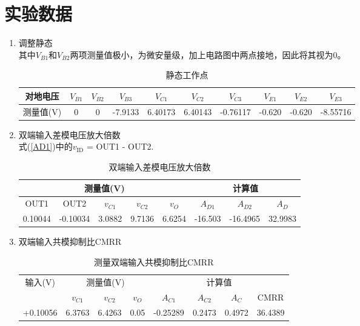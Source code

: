 \documentclass[a4paper]{article}
\begin{document}
\section{实验数据}
\begin{enumerate}
\item 调整静态\\
其中$V_{B1}$和$V_{B2}$两项测量值极小，为微安量级，加上电路图中两点接地，因此将其视为0。
\begin{table}[!h]
\centering
\caption{静态工作点}
\label{Q}
\begin{tabular}{|c|c|c|c|c|c|c|c|c|c|}
\hline
对地电压 & $V_{B1}$ & $V_{B2}$ & $V_{B3}$ & $V_{C1}$ & $V_{C2}$ & $V_{C3}$  & $V_{E1}$ & $V_{E2}$ & $V_{E3}$ \\ \hline
测量值(V)  & 0        & 0        & -7.9133 & 6.40173 & 6.40143 & -0.76117 & -0.620     & -0.620  & -8.55716   \\ \hline
\end{tabular}
\end{table}
\item 双端输入差模电压放大倍数\\
式(\ref{AD1})中的$v_{\text{ID}}$ = OUT1 - OUT2.
\begin{table}[!h]
\centering
\caption{双端输入差模电压放大倍数}
\label{AD2table}
\begin{tabular}{|c|c|c|c|c|c|c|c|}
\hline
\multicolumn{5}{|c|}{测量值(V)}                       & \multicolumn{3}{c|}{计算值}      \\ \hline
OUT1    & OUT2     & $v_{C1}$ & $v_{C2}$ & $v_{O}$ & $A_{D1}$ & $A_{D2}$ & $A_D$   \\ \hline
0.10044 & -0.10034 & 3.0882   & 9.7136   & 6.6254  & -16.503  & -16.4965 & 32.9983 \\ \hline
\end{tabular}
\end{table}
\item 双端输入共模抑制比CMRR\\
\begin{table}[!h]
\centering
\caption{测量双端输入共模抑制比CMRR}
\label{CMRRtable}
\begin{tabular}{|c|c|c|c|c|c|c|c|}
\hline
\multirow{2}{*}{输入(V)} & \multicolumn{3}{c|}{测量值(V)}   & \multicolumn{4}{c|}{计算值}                 \\ \cline{2-8} 
                       & $v_{C1}$ & $v_{C2}$ & $v_{O}$ & $A_{C1}$ & $A_{C2}$ & $A_C$    & CMRR    \\ \hline
+0.10056               & 6.3763   & 6.4263   & 0.05    & -0.25289 & 0.2473   & 0.4972   & 36.4389 \\ \hline

\end{tabular}
\end{table}
\end{enumerate}
\end{document}

